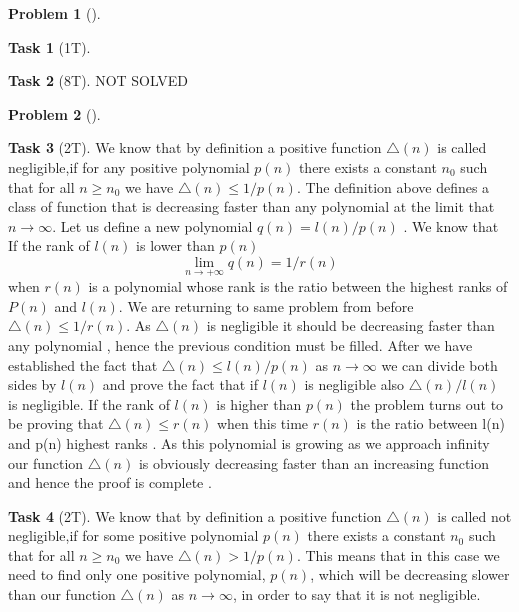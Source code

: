 \documentclass[11pt,twoside]{article}
\theoremstyle{definition}
\newtheorem{amsproblem}{Problem}
\newtheorem{amssubproblem}{Task}[amsproblem]
\newenvironment{problem}[1][]{%
  \begin{amsproblem}[#1]
  }{%
  \end{amsproblem}
}
\newenvironment{subproblem}[1][]{%
  \begin{amssubproblem}[#1]
  }{%
  \end{amssubproblem}
}
\newcommand{\TP}[1]{#1T}
\begin{document}
\begin{problem}
\begin{subproblem}[\TP{1}]
    
  \end{subproblem}
  \begin{subproblem}[\TP{8}]
    NOT SOLVED %
  \end{subproblem}
\end{problem}

\noindent
\hrulefill

\begin{problem}
  \begin{subproblem}[\TP{2}]
    We know that by definition a positive function $\triangle(n) $ is called negligible,if for any positive polynomial \textit{$p(n)$} there exists a constant \textit{$n_0$} such that  for all \textit{$n \geq n_0$} we have $\triangle(n) \leq 1/p(n)$. \newline 
    The definition above defines a class of function that is decreasing faster than any polynomial at the limit that $n \rightarrow \infty $. \newline 
    Let us define a new polynomial $q(n)=l(n)/{p(n)}$ . We know that If the rank of $l(n)$ is lower than $p(n)$  \[\lim_{n \to +\infty} q(n)=1/r(n)\] when $r(n)$ is a polynomial whose rank is the ratio between the highest ranks of $P(n)$ and $l(n)$. We are returning to same problem from before $\triangle(n)\leq 1/r(n)$. As $\triangle(n)$ is negligible it should be decreasing faster than any polynomial , hence the previous condition must be filled. After we have established the fact that $\triangle(n)\leq l(n)/p(n)$ as $n \rightarrow \infty $ we can divide both sides by $l(n)$ and prove the fact that if $l(n) $ is negligible also $\triangle(n)/{l(n)}$ is negligible. \newline 
    If the rank of $l(n)$ is higher than $p(n)$ the problem turns out to be proving that $\triangle(n)\leq r(n)$ when this time $r(n)$ is the ratio between l(n) and p(n) highest ranks . As this polynomial is growing as we approach infinity our function $\triangle(n)$ is obviously decreasing faster than an increasing function and hence the proof is complete .
  \end{subproblem}
  \begin{subproblem}[\TP{2}]
    We know that by definition a positive function $\triangle(n) $ is called not negligible,if for some positive polynomial \textit{$p(n)$} there exists a constant \textit{$n_0$} such that  for all \textit{$n \geq n_0$} we have $\triangle(n) > 1/p(n)$. This means that in this case we need to find only one positive polynomial, \textit{$p(n)$}, which will be decreasing slower than our function $\triangle(n) $ as $n \rightarrow \infty $, in order to say that it is not negligible.  \newline 

\end{subproblem}
\end{problem}
\end{document}

